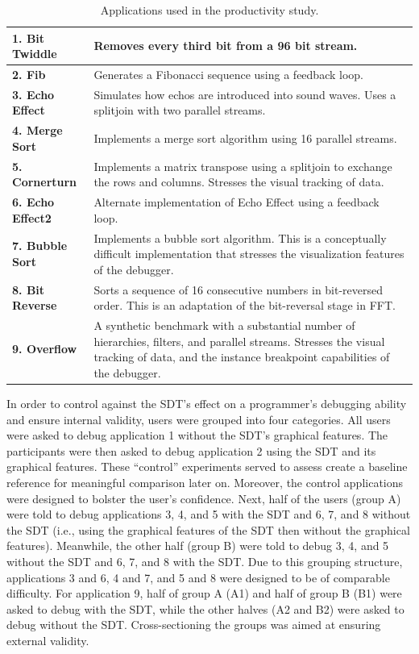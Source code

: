 \documentclass[11pt, letterpaper, onecolumn]{article}
\begin{document}
\begin{table}
\caption{Applications used in the productivity study.}
\centering
\begin{tabular}{|l|p{5.0in}|} \hline
\label{tab:applications}
{\bf 1. Bit Twiddle} & Removes every third bit from a 96 bit stream.\\ \hline
{\bf 2. Fib}         & Generates a Fibonacci sequence using a feedback loop.\\ \hline
{\bf 3. Echo Effect} & Simulates how echos are introduced into sound waves. Uses a splitjoin with two parallel streams.\\ \hline
{\bf 4. Merge Sort}  & Implements a merge sort algorithm using 16 parallel streams.\\ \hline
{\bf 5. Cornerturn}  & Implements a matrix transpose using a splitjoin to exchange the rows and columns. Stresses the visual tracking of data.\\ \hline
{\bf 6. Echo Effect2}& Alternate implementation of Echo Effect using a feedback loop.\\ \hline
{\bf 7. Bubble Sort} & Implements a bubble sort algorithm. This is a conceptually difficult implementation that stresses the visualization features of the debugger.\\ \hline
{\bf 8. Bit Reverse} & Sorts a sequence of 16 consecutive numbers in bit-reversed order. This is an adaptation of the bit-reversal stage in FFT.\\ \hline
{\bf 9. Overflow}  & A synthetic benchmark with a substantial number of hierarchies, filters, and parallel streams. Stresses the visual tracking of data, and the instance breakpoint capabilities of the debugger.\\ \hline
\end{tabular}
\end{table}

In  order  to control  against  the  SDT's  effect on  a  programmer's
debugging  ability and  ensure internal  validity, users  were grouped
into four  categories.  All  users were asked  to debug  application 1
without the SDT's graphical features. The participants were then asked
to debug application 2 using the SDT and its graphical features. These
``control'' experiments  served to assess create  a baseline reference
for   meaningful   comparison  later   on.    Moreover,  the   control
applications  were designed  to bolster  the user's  confidence. Next,
half of the users (group A)  were told to debug applications 3, 4, and
5  with the  SDT and  6, 7,  and 8  without the  SDT (i.e.,  using the
graphical   features   of  the   SDT   then   without  the   graphical
features). Meanwhile, the  other half (group B) were  told to debug 3,
4, and 5  without the SDT and 6,  7, and 8 with the SDT.   Due to this
grouping structure,  applications 3 and 6, 4  and 7, and 5  and 8 were
designed to be  of comparable difficulty.  For application  9, half of
group A  (A1) and half of  group B (B1)  were asked to debug  with the
SDT, while  the other halves (A2  and B2) were asked  to debug without
the SDT.   Cross-sectioning the groups was aimed  at ensuring external
validity.
\end{document}
